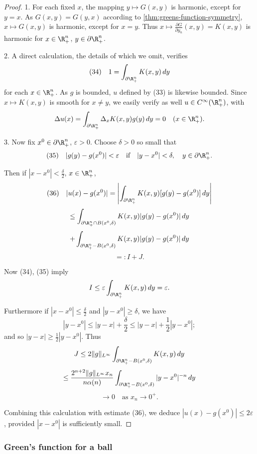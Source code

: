 \begin{proof}
1. For each fixed $x$, the mapping $y \mapsto G(x,y)$ is harmonic, except for $y = x$. As $G(x,y) = G(y,x)$ according to \cref{thm:greens-function-symmetry}, $x \mapsto G(x,y)$ is harmonic, except for $x = y$. Thus $x \mapsto \frac{\partial G}{\partial y_n}(x,y) = K(x,y)$ is harmonic for $x \in \R^n_+$, $y \in \partial \R^n_+$.

2. A direct calculation, the details of which we omit, verifies
$$(34) \quad 1 = \int_{\partial \R^n_+} K(x,y) \, dy$$
for each $x \in \R^n_+$. As $g$ is bounded, $u$ defined by (33) is likewise bounded. Since $x \mapsto K(x,y)$ is smooth for $x \neq y$, we easily verify as well $u \in C^{\infty}(\R^n_+)$, with
$$\Delta u(x) = \int_{\partial \R^n_+} \Delta_x K(x,y) g(y) \, dy = 0 \quad (x \in \R^n_+).$$

3. Now fix $x^0 \in \partial \R^n_+$, $\varepsilon > 0$. Choose $\delta > 0$ so small that
$$(35) \quad |g(y) - g(x^0)| < \varepsilon \quad \text{if} \quad |y - x^0| < \delta, \quad y \in \partial \R^n_+.$$

Then if $|x - x^0| < \frac{\delta}{2}$, $x \in \R^n_+$,
$$(36) \quad |u(x) - g(x^0)| = \left| \int_{\partial \R^n_+} K(x,y)[g(y) - g(x^0)] \, dy \right|$$
$$\leq \int_{\partial \R^n_+ \cap B(x^0,\delta)} K(x,y)|g(y) - g(x^0)| \, dy$$
$$+ \int_{\partial \R^n_+ - B(x^0,\delta)} K(x,y)|g(y) - g(x^0)| \, dy$$
$$=: I + J.$$

Now (34), (35) imply
$$I \leq \varepsilon \int_{\partial \R^n_+} K(x,y) \, dy = \varepsilon.$$

Furthermore if $|x-x^0| \leq \frac{\delta}{2}$ and $|y-x^0| \geq \delta$, we have
$$|y-x^0| \leq |y-x| + \frac{\delta}{2} \leq |y-x| + \frac{1}{2}|y-x^0|;$$
and so $|y-x| \geq \frac{1}{2}|y-x^0|$. Thus
$$J \leq 2\|g\|_{L^\infty} \int_{\partial\R^n_+ - B(x^0,\delta)} K(x,y) \, dy$$
$$\leq \frac{2^{n+2}\|g\|_{L^\infty} x_n}{n\alpha(n)} \int_{\partial\R^n_+ - B(x^0,\delta)} |y-x^0|^{-n} \, dy$$
$$\to 0 \quad \text{as } x_n \to 0^+.$$

Combining this calculation with estimate (36), we deduce $|u(x) - g(x^0)| \leq 2\varepsilon$, provided $|x-x^0|$ is sufficiently small.
\end{proof}

\subsubsection{Green's function for a ball}
\label{sec:laplace-greens-function-ball}

